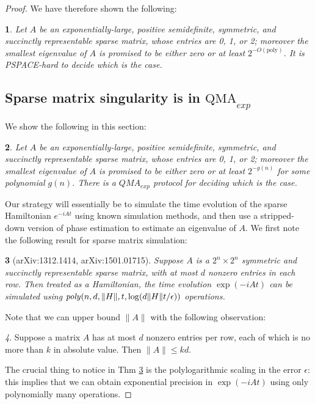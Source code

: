 \documentclass[english]{article}
\numberwithin{equation}{section}
\numberwithin{figure}{section}
\theoremstyle{plain}
\newtheorem{thm}{\protect\theoremname}
\theoremstyle{definition}
\theoremstyle{plain}
\newtheorem{lem}[thm]{\protect\lemmaname}
\theoremstyle{definition}
\theoremstyle{remark}
\newtheorem{rem}[thm]{\protect\remarkname}
\theoremstyle{remark}
\theoremstyle{plain}
\providecommand{\lemmaname}{Lemma}
\providecommand{\remarkname}{Remark}
\providecommand{\theoremname}{Theorem}
\begin{document}
\begin{proof}
We have therefore shown the following:
\begin{lem}
Let $A$ be an exponentially-large, positive semidefinite, symmetric, and succinctly representable sparse matrix, whose entries are 0, 1, or 2; moreover the smallest eigenvalue of $A$ is promised to be either zero or at least $2^{-O(\text{poly})}$. It is PSPACE-hard to decide which is the case.
\end{lem}

\subsection{Sparse matrix singularity is in $\text{QMA}_{exp}$}
We show the following in this section:
\begin{lem}
Let $A$ be an exponentially-large, positive semidefinite, symmetric, and succinctly representable sparse matrix, whose entries are 0, 1, or 2; moreover the smallest eigenvalue of $A$ is promised to be either zero or at least $2^{-g(n)}$ for some polynomial $g(n)$. There is a $QMA_{exp}$ protocol for deciding which is the case.
\end{lem}
Our strategy will essentially be to simulate the time evolution of the sparse Hamiltonian $e^{-iAt}$ using known simulation methods, and then use a stripped-down version of phase estimation to estimate an eigenvalue of $A$. We first note the following result for sparse matrix simulation:
\begin{thm}[arXiv:1312.1414, arXiv:1501.01715] \label{thm:ham_sim}
Suppose $A$ is a $2^n \times 2^n$ symmetric and succinctly representable sparse matrix, with at most $d$ nonzero entries in each row. Then treated as a Hamiltonian, the time evolution $\exp(-iAt)$ can be simulated using $\text{\emph{poly}}(n,d,\|H\|, t, \log(d\|H\|t/\epsilon))$ operations.
\end{thm}
Note that we can upper bound $\|A\|$ with the following observation:
\begin{rem}
Suppose a matrix $A$ has at most $d$ nonzero entries per row, each of which is no more than $k$ in absolute value. Then $\| A \| \le kd$.
\end{rem}
The crucial thing to notice in Thm \ref{thm:ham_sim} is the polylogarithmic scaling in the error $\epsilon$: this implies that we can obtain exponential precision in $\exp(-iAt)$ using only polynomially many operations. 


\end{proof}
\end{document}
